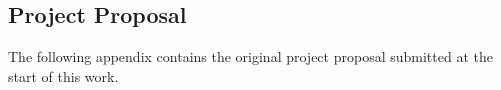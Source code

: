 \documentclass[12pt,letterpaper]{article}
\begin{document}

\makereference


    \cite{jin2021lean}
    \cite{li2024redesigning}
    \cite{schaub2015design}
    \cite{wen2025teaching}



\clearpage
\makeappendix

\subsection{Project Proposal}
The following appendix contains the original project proposal submitted at the start of this work.




\end{document}

